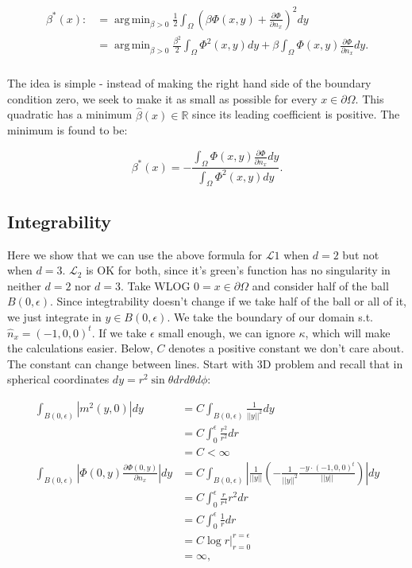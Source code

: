\documentclass[paper=a4, fontsize=11pt]{scrartcl} %
\DeclareMathOperator*{\argmin}{arg\,min}
\numberwithin{equation}{section} %
\numberwithin{figure}{section} %
\numberwithin{table}{section} %
\newcommand{\Op}{\mathcal{L}}
\begin{document}
\begin{align}
  \begin{split}
    \beta^{*}(x) :&= \argmin_{\beta > 0} \frac{1}{2} \int_{\Omega} (\beta \Phi(x,y) + \frac{\partial \Phi}{\partial n_{x}} )^{2} dy \\
    &= \argmin_{\beta > 0} \frac{\beta^2}{2} \int_{\Omega} \Phi^2(x,y) dy+\beta \int_{\Omega} \Phi(x,y) \frac{\partial \Phi}{\partial n_{x}} dy. \\
  \end{split}
\end{align}

The idea is simple - instead of making the right hand side of the boundary condition zero, we seek to make it as small as possible for 
every $x\in \partial \Omega$. This quadratic has a minimum $\hat{\beta}(x) \in \mathbb{R}$ since its leading coefficient 
is positive. The minimum is found to be:

$$
\beta^{*}(x) = - \frac{\int_{\Omega}  \Phi(x,y) \frac{\partial \Phi}{\partial n_{x}} dy}{\int_{\Omega}  \Phi^2(x,y) dy}.
$$



\subsection{Integrability}\label{integrability}
Here we show that we can use the above formula for $\Op{1}$ when $d=2$ but not when $d=3$.
$\Op_{2}$ is OK for both, since it's green's function has no singularity in neither $d=2$ nor $d=3$.
Take WLOG $0=x\in \partial \Omega$ and consider half of the ball $B(0,\epsilon)$.
Since integtrability doesn't change if we take half of the ball or all of it, we just integrate in $y\in B(0,\epsilon)$. We take the boundary
of our domain s.t.  $\hat{n}_x = (-1,0,0)^t$.  If we take $\epsilon$ small enough, we can ignore $\kappa$, which will make the calculations
easier. Below, $C$ denotes a positive constant we don't care about. The constant can change between lines. 
Start with 3D problem and recall that in spherical coordinates $dy = r^2 \sin \theta dr d\theta d \phi$:

\begin{align*}
    \int_{B(0,\epsilon)} |m^2(y,0)|dy &= C\int_{B(0,\epsilon)} \frac{1}{||y||^2} dy \\
    &= C \int_{0}^{\epsilon} \frac{r^2}{r^2} dr \\
    &= C < \infty \\
    \int_{B(0,\epsilon)} |\Phi(0,y) \frac{\partial \Phi(0,y)}{\partial n_x}| dy &= C\int_{B(0,\epsilon)} |\frac{1}{||y||} (-\frac{1}{||y||^2} \frac{-y\cdot (-1,0,0)^t}{||y||})| dy\\
    &= C \int_{0}^{\epsilon} \frac{r }{r^4}r^2  dr  \\
    &= C \int_{0}^{\epsilon} \frac{1}{r} dr \\
    &= C \log r|_{r=0}^{r=\epsilon} \\
    & = \infty,
\end{align*}
\end{document}
